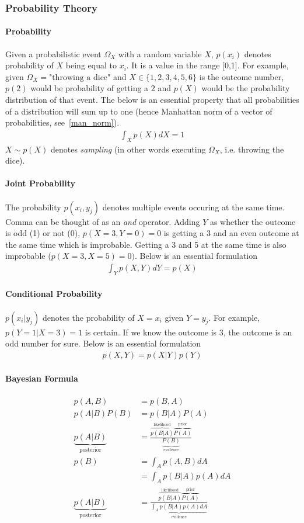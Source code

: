 \documentclass{article}
\numberwithin{equation}{subsection}
\begin{document}
\subsubsection{Probability Theory}
\paragraph{Probability}
Given a probabilistic event $\Omega_X$ with a random variable $X$, $p(x_i)$ denotes probability of $X$ being equal to $x_i$. It is a value in the range [0,1]. For example, given $\Omega_X=\text{"throwing a dice"}$ and $X \in \{1,2,3,4,5,6\}$ is the outcome number, $p(2)$ would be probability of getting a $2$ and $p(X)$ would be the probability distribution of that event. The below is an essential property that all probabilities of a distribution will sum up to one (hence Manhattan norm of a vector of probabilities, see~\ref{man_norm}).
\begin{align}
    \int_X p(X)dX = 1
\end{align}
$X \sim p(X)$ denotes \textit{sampling} (in other words executing $\Omega_X$, i.e. throwing the dice).
\paragraph{Joint Probability}
The probability $p(x_i, y_j)$ denotes multiple events occuring at the same time. Comma can be thought of as an \textit{and} operator. Adding $Y$ as whether the outcome is odd (1) or not (0), $p(X=3,Y=0)=0$ is getting a 3 and an even outcome at the same time which is improbable. Getting a 3 and 5 at the same time is also improbable ($p(X=3,X=5)=0)$. Below is an essential formulation
\begin{align}
    \int_Y p(X,Y)dY = p(X)
\end{align}
\paragraph{Conditional Probability}
$p(x_i|y_j)$ denotes the probability of $X=x_i$ given $Y=y_j$. For example, $p(Y=1|X=3)=1$ is certain. If we know the outcome is 3, the outcome is an odd number for sure. Below is an essential formulation
\begin{align}
    p(X,Y) = p(X|Y)p(Y)
    \label{joint_cond_prob}
\end{align}
\paragraph{Bayesian Formula} 
\begin{align}
    p(A,B) &= p(B,A)\\
    p(A|B)P(B) &= p(B|A)P(A)\\
    \underbrace{p(A|B)}_{\text{posterior}} &= \frac{\overbrace{p(B|A)}^\text{likelihood}\overbrace{P(A)}^\text{prior}}{\underbrace{P(B)}_\text{evidence}}\\
    p(B) &= \int_A p(A,B)dA\\
    &= \int_A p(B|A)p(A)dA\\
    \underbrace{p(A|B)}_{\text{posterior}} &= \frac{\overbrace{p(B|A)}^\text{likelihood}\overbrace{P(A)}^\text{prior}}{\underbrace{\int_A p(B|A)p(A)dA}_\text{evidence}}\label{bayesian}
\end{align}
\end{document}
